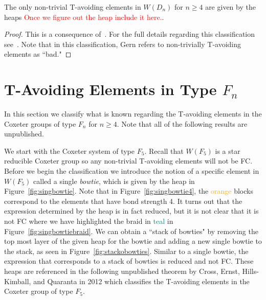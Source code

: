 \begin{theorem}
 The only non-trivial T-avoiding elements in $W(D_n)$ for $n \geq 4$ are given by the heaps \textcolor{red}{Once we figure out the heap include it here.}.
\begin{proof}
	This is a consequence of~\cite[Section 2.2]{Gern2013a}. For the full details regarding this classification see~\cite{Gern2013a}. Note that in this classification, Gern  refers to non-trivially T-avoiding elements as ``bad."
\end{proof}
\end{theorem}



\section{T-Avoiding Elements in Type $F_n$}

In this section we classify what is known regarding the T-avoiding elements in the Coxeter groups of type $F_n$ for $n \geq 4$. Note that all of the following results are unpublished. %

We start with the Coxeter system of type $F_5$.  Recall that $W(F_5)$ is a star reducible Coxeter group so any non-trivial T-avoiding elements will not be FC. Before we begin the classification we introduce the notion of a specific element in $W(F_5)$ called a single \emph{bowtie}, which is given by the heap in Figure~\ref{fig:singbowtie}. Note that in Figure~\ref{fig:singbowtie4}, the \textcolor{orange}{orange} blocks correspond to the elements that have bond strength 4. It turns out that the expression determined by the heap is in fact reduced, but it is not clear that it is not FC where we have highlighted the braid in \textcolor{teal}{teal} in Figure~\ref{fig:singbowtiebraid}. We can obtain a ``stack of bowties" by removing the top most layer of the given heap for the bowtie and adding a new single bowtie to the stack, as seen in Figure~\ref{fig:stackobowties}. Similar to a single bowtie, the expression that corresponds to a stack of bowties is reduced and not FC. These heaps are referenced in the following unpublished theorem by Cross, Ernst, Hills-Kimball, and Quaranta in 2012 which classifies the T-avoiding elements in the Coxeter group of type $F_5$.

